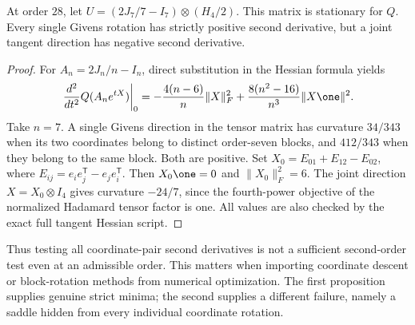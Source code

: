 \begin{proposition}
At order $28$, let
$U=(2J_7/7-I_7)\otimes(H_4/2)$. This matrix is stationary for $Q$.
Every single Givens rotation has strictly positive second derivative,
but a joint tangent direction has negative second derivative.
\end{proposition}
\begin{proof}
For $A_n=2J_n/n-I_n$, direct substitution in the Hessian formula yields
\[
 \left.\frac{d^2}{dt^2}Q(A_ne^{tX})\right|_0
 =-\frac{4(n-6)}n\|X\|_F^2
  +\frac{8(n^2-16)}{n^3}\|X\one\|^2.
\]
Take $n=7$. A single Givens direction in the tensor matrix has
curvature $34/343$ when its two coordinates belong to distinct
order-seven blocks, and $412/343$ when they belong to the same block.
Both are positive. Set
$X_0=E_{01}+E_{12}-E_{02}$, where
$E_{ij}=e_ie_j^{\mathsf T}-e_je_i^{\mathsf T}$. Then
$X_0\one=0$ and $\|X_0\|_F^2=6$. The joint direction
$X=X_0\otimes I_4$ gives curvature $-24/7$, since the fourth-power
objective of the normalized Hadamard tensor factor is one.
All values are also checked by the exact full tangent Hessian script.
\end{proof}
Thus testing all coordinate-pair second derivatives is not a sufficient
second-order test even at an admissible order. This matters when
importing coordinate descent or block-rotation methods from numerical
optimization. The first proposition supplies genuine strict minima;
the second supplies a different failure, namely a saddle hidden from
every individual coordinate rotation.
